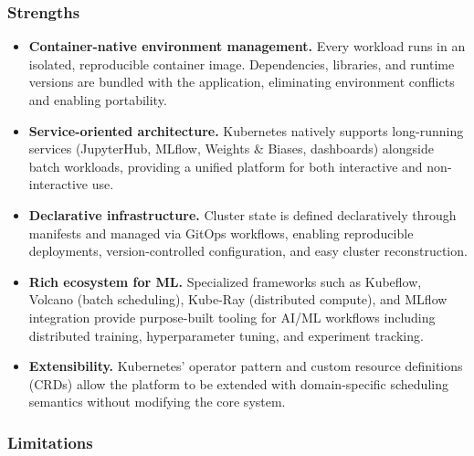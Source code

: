\subsubsection{Strengths}

\begin{itemize}
    \item \textbf{Container-native environment management.} Every workload runs in an isolated, reproducible container image. Dependencies, libraries, and runtime versions are bundled with the application, eliminating environment conflicts and enabling portability.

    \item \textbf{Service-oriented architecture.} Kubernetes natively supports long-running services (JupyterHub, MLflow, Weights \& Biases, dashboards) alongside batch workloads, providing a unified platform for both interactive and non-interactive use.
    \item \textbf{Declarative infrastructure.} Cluster state is defined declaratively through manifests and managed via GitOps workflows, enabling reproducible deployments, version-controlled configuration, and easy cluster reconstruction.
    \item \textbf{Rich ecosystem for ML.} Specialized frameworks such as Kubeflow, Volcano (batch scheduling), Kube-Ray (distributed compute), and MLflow integration provide purpose-built tooling for AI/ML workflows including distributed training, hyperparameter tuning, and experiment tracking.

    \item \textbf{Extensibility.} Kubernetes' operator pattern and custom resource definitions (CRDs) allow the platform to be extended with domain-specific scheduling semantics without modifying the core system.

\end{itemize}

\subsubsection{Limitations}

